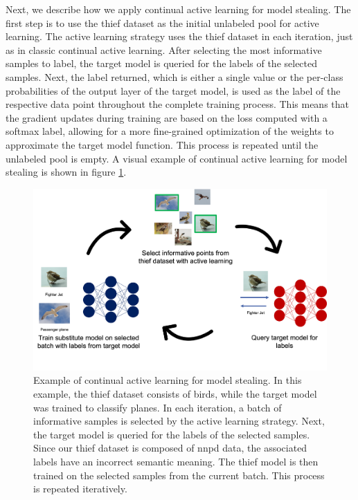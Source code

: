 Next, we describe how we apply continual active learning for model stealing. The first step is to use the thief dataset as the initial unlabeled pool for
active learning. The active learning strategy uses the thief dataset in each iteration, just as in classic continual active learning. After selecting the
most informative samples to label, the target model is queried for the labels of the selected samples. Next, the label returned, which is either a single
value or the per-class probabilities of the output layer of the target model, is used as the label of the respective data point throughout the complete
training process. This means that the gradient updates during training are based on the loss computed with a softmax label, allowing for a more fine-grained
optimization of the weights to approximate the target model function. This
process is repeated until the unlabeled pool is empty. A visual example of continual active learning for model stealing is shown in figure
\ref{fig:CalmsWorkflow}. \par
\begin{figure}[ht]
    \centering
    \includegraphics[width=.7\linewidth]{images/Calms_workflow.png}
    \caption[Continual active learning for model stealing example]{Example of continual active learning for model stealing. In this example, the thief
    dataset consists of birds, while the target model was trained to classify planes. In each iteration, a batch of informative samples is selected by the active learning
    strategy. Next, the target model is queried for the labels of the selected samples. Since our thief dataset is composed of \gls{nnpd} data, the associated labels have
    an incorrect semantic meaning. The thief model is then trained on the selected samples from the current batch. This process is repeated iteratively.}
    \label{fig:CalmsWorkflow}
\end{figure}



